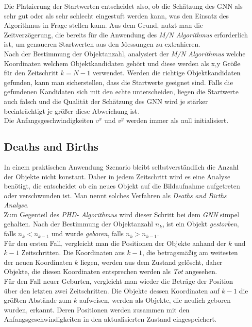 \documentclass[10pt,a4paper]{article}
\begin{document}
Die Platzierung der Startwerten entscheidet also, ob die Schätzung des GNN als sehr gut oder als sehr schlecht eingestuft werden kann, was den Einsatz des Algorithmus in Frage stellen kann. Aus dem Grund, nutzt man die Zeitverzögerung, die bereits für die Anwendung des \textit{M/N Algorithmus} erforderlich ist, um genaueren Startwerten aus den Messungen zu extrahieren.\\
Nach der Bestimmung der Objektanzahl, analysiert der \textit{M/N Algorithmus} welche Koordinaten welchem Objektkandidaten gehört und diese werden als x,y Größe für den Zeitschritt $k = N-1$ verwendet. Werden die richtige Objektkandidaten gefunden, kann man sicherstellen, dass die Startwerte geeignet sind. Falls die gefundenen Kandidaten sich mit den echte unterscheiden, liegen die Startwerte auch falsch und die Qualität der Schätzung des GNN wird je stärker beeinträchtigt je größer diese Abweichung ist.\\
Die Anfangsgeschwindigkeiten $v^x$ und $v^y$ werden immer als null initialisiert.
\subsection{Deaths and Births}\label{subsub:GNNDeathBirth}
In einem praktischen Anwendung Szenario bleibt selbstverständlich die Anzahl der Objekte nicht konstant. Daher in jedem Zeitschritt wird es eine Analyse benötigt, die entscheidet ob ein neues Objekt auf die Bildaufnahme aufgetreten oder verschwunden ist. Man nennt solches Verfahren als \textit{Deaths and Births Analyse}.\\
Zum Gegenteil des \textit{PHD- Algorithmus} wird dieser Schritt bei dem \textit{GNN } simpel gehalten. Nach der Bestimmung der Objektanzahl $n_k$, ist ein Objekt \textit{gestorben}, falls $n_k < n_{k-1}$ und wurde \textit{geboren}, falls $n_k > n_{k-1}$.\\
Für den ersten Fall, vergleicht man die Positionen der Objekte anhand der $k$ und $k-1$ Zeitschritten. Die Koordinaten aus $k-1$, die betragsmäßig am weitesten der neuen Koordinaten $k$ liegen, werden aus dem Zustand gelöscht, daher Objekte, die diesen Koordinaten entsprechen werden als \textit{Tot} angesehen.\\
Für den Fall neuer Geburten, vergleicht man wieder die Beträge der Position über den letzten zwei Zeitschritten. Die Objekte dessen Koordinaten auf $k-1$ die größten Abstände zum $k$ aufweisen, werden als Objekte, die neulich geboren wurden, erkannt. Deren Positionen werden zusammen mit den Anfangsgeschwindigkeiten in den aktualisierten Zustand eingespeichert.
\newline
\newline
\end{document}
